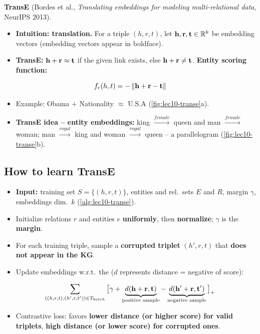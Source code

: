 \textbf{TransE} (Bordes et al., \emph{Translating embeddings for modeling
multi-relational data}, NeurIPS 2013).
\begin{itemize}
  \item \textbf{Intuition: translation.} For a triple $(h,r,t)$, let
    $\mathbf{h},\mathbf{r},\mathbf{t}\in\mathbb{R}^k$ be embedding vectors (embedding vectors appear in
    boldface).
  \item \textbf{TransE:} $\mathbf{h}+\mathbf{r}\approx\mathbf{t}$ if the given link exists, else
    $\mathbf{h}+\mathbf{r}\neq\mathbf{t}$. \textbf{Entity scoring function:}
\end{itemize}
\begin{equation}\label{eq:lec10-transe}
  f_r(h,t) = -\left\lVert \mathbf{h}+\mathbf{r}-\mathbf{t} \right\rVert
\end{equation}
\begin{itemize}
  \item Example: Obama $+$ Nationality $\approx$ U.S.A
    (\cref{fig:lec10-transe}a).
  \item \textbf{TransE idea -- entity embeddings:} king $\xrightarrow{female}$
    queen and man $\xrightarrow{female}$ woman; man $\xrightarrow{royal}$ king and
    woman $\xrightarrow{royal}$ queen -- a parallelogram
    (\cref{fig:lec10-transe}b).
\end{itemize}

\subsection{How to learn TransE}\label{sec:lec10-transe-learn}

\begin{itemize}
  \item \textbf{Input:} training set $S=\{(h,r,t)\}$, entities and rel.\ sets $E$
    and $R$, margin $\gamma$, embeddings dim.\ $k$ (\cref{alg:lec10-transe}).
  \item Initialize relations $r$ and entities $e$ \textbf{uniformly}, then
    \textbf{normalize}; $\gamma$ is the \textbf{margin}.
  \item For each training triple, sample a \textbf{corrupted triplet} $(h',r,t)$
    that \textbf{does not appear in the KG}.
  \item Update embeddings w.r.t.\ the  ($d$ represents
    distance = negative of score):
\end{itemize}
\begin{equation}\label{eq:lec10-loss}
  \sum_{((h,r,t),(h',r,t'))\in T_{batch}}
  \big[\gamma + \underbrace{d(\mathbf{h}+\mathbf{r},\mathbf{t})}_{\text{positive sample}}
             - \underbrace{d(\mathbf{h}'+\mathbf{r},\mathbf{t}')}_{\text{negative sample}}\big]_+
\end{equation}
\begin{itemize}
  \item[] Contrastive loss: favors \textbf{lower distance (or higher score) for
    valid triplets}, \textbf{high distance (or lower score) for corrupted ones}.
\end{itemize}


